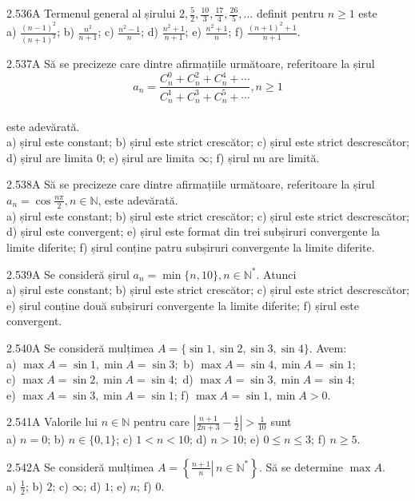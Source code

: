 \documentclass[11pt]{article}
\begin{document}
2.536A Termenul general al șirului $2, \frac{5}{2}, \frac{10}{3}, \frac{17}{4}, \frac{26}{5}, \ldots$ definit pentru $n \geq 1$ este\\ a) $\frac{(n-1)^{2}}{(n+1)^{2}}$; b) $\frac{n^{2}}{n+1}$; c) $\frac{n^{2}-1}{n}$; d) $\frac{n^{2}+1}{n+1}$; e) $\frac{n^{2}+1}{n}$; f) $\frac{(n+1)^{2}+1}{n+1}$.

2.537A Să se precizeze care dintre afirmațiile următoare, referitoare la șirul $$a_{n}=\frac{C_{n}^{0}+C_{n}^{2}+C_{n}^{4}+\cdots}{C_{n}^{1}+C_{n}^{3}+C_{n}^{5}+\cdots}, n \geq 1$$\\este adevărată.\\ a) șirul este constant; b) șirul este strict crescător; c) șirul este strict descrescător; d) șirul are limita $0$; e) șirul are limita $\infty$; f) șirul nu are limită.

2.538A Să se precizeze care dintre afirmațiile următoare, referitoare la șirul $a_{n}=\cos \frac{n \pi}{2}, n \in \mathbb{N}$, este adevărată.\\ a) șirul este constant; b) șirul este strict crescător; c) șirul este strict descrescător; d) șirul este convergent; e) șirul este format din trei subșiruri convergente la limite diferite; f) șirul conține patru subșiruri convergente la limite diferite.

2.539A Se consideră șirul $a_{n}=\min \{n, 10\}, n \in \mathbb{N}^{*}$. Atunci\\ a) șirul este constant; b) șirul este strict crescător; c) șirul este strict descrescător; e) șirul conține două subșiruri convergente la limite diferite; f) șirul este convergent.

2.540A Se consideră mulțimea $A=\{\sin 1, \sin 2, \sin 3, \sin 4\}$. Avem:\\ a) $\max A=\sin 1, \min A=\sin 3 ;$ b) $\max A=\sin 4, \min A=\sin 1$;\\ c) $\max A=\sin 2, \min A=\sin 4 ;$ d) $\max A=\sin 3, \min A=\sin 4$;\\ e) $\max A=\sin 3, \min A=\sin 1$; f) $\max A=\sin 1, \min A>0$.

2.541A Valorile lui $n \in \mathbb{N}$ pentru care $\left|\frac{n+1}{2 n+3}-\frac{1}{2}\right|>\frac{1}{10}$ sunt\\ a) $n=0$; b) $n \in\{0,1\}$; c) $1<n<10$; d) $n>10$; e) $0 \leq n \leq 3$; f) $n \geq 5$.

2.542A Se consideră mulțimea $A=\left\{\left.\frac{n+1}{n} \right\rvert\, n \in \mathbb{N}^{*}\right\}$. Să se determine $\max A$.\\ a) $\frac{1}{2}$; b) $2$; c) $\infty$; d) $1$; e) $n$; f) $0$.
\end{document}

